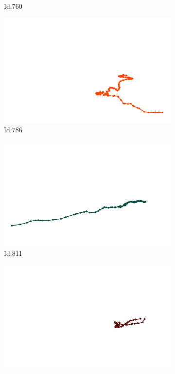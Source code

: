\documentclass[12pt,twoside]{report}
\begin{document}
\begin{figure}
\begin{subfigure}[b]{0.20\textwidth}
\caption{Id:760}
\end{subfigure}
\begin{subfigure}[b]{0.20\textwidth}
\centering
\includegraphics[width=\textwidth]{../trajectories/786.png}
\caption{Id:786}
\end{subfigure}
\begin{subfigure}[b]{0.20\textwidth}
\centering
\includegraphics[width=\textwidth]{../trajectories/811.png}
\caption{Id:811}
\end{subfigure}
\begin{subfigure}[b]{0.20\textwidth}
\centering
\includegraphics[width=\textwidth]{../trajectories/855.png}

\end{subfigure}
\end{figure}
\end{document}
